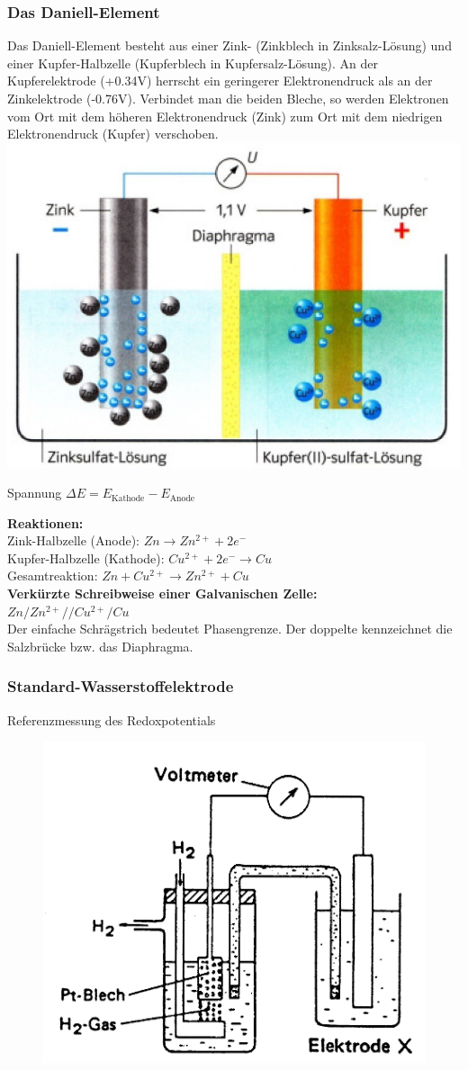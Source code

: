 \subsubsection{Das Daniell-Element}
Das Daniell-Element besteht aus einer Zink- (Zinkblech in Zinksalz-Lösung) und einer Kupfer-Halbzelle (Kupferblech in Kupfersalz-Lösung). An der Kupferelektrode (+0.34V) herrscht ein geringerer Elektronendruck als an der Zinkelektrode (-0.76V). Verbindet man die beiden Bleche, so werden Elektronen vom Ort mit dem höheren Elektronendruck (Zink) zum Ort mit dem niedrigen Elektronendruck (Kupfer) verschoben.\\
\includegraphics[width=0.7\linewidth]{images/10_Daniell_Element.png}

Spannung $\Delta E = E_\text{Kathode}-E_\text{Anode}$ 

\textbf{Reaktionen:}\\
Zink-Halbzelle (Anode): $Zn \rightarrow Zn^{2+} + 2 e^-$ \\
Kupfer-Halbzelle (Kathode): $Cu^{2+} + 2 e^- \rightarrow Cu$ \\
Gesamtreaktion: $Zn + Cu^{2+} \rightarrow Zn^{2+} + Cu$\\
\textbf{Verkürzte Schreibweise einer Galvanischen Zelle:}\\
$Zn/Zn^{2+} // Cu^{2+}/Cu$\\
Der einfache Schrägstrich bedeutet Phasengrenze. Der doppelte kennzeichnet die Salzbrücke bzw. das Diaphragma.

\subsubsection{Standard-Wasserstoffelektrode}
Referenzmessung des Redoxpotentials

\begin{figure}[htbp!]
	\centering
	\includegraphics[width=0.6\linewidth]{images/10_Wasserstoffelektrode.png}
\end{figure}

